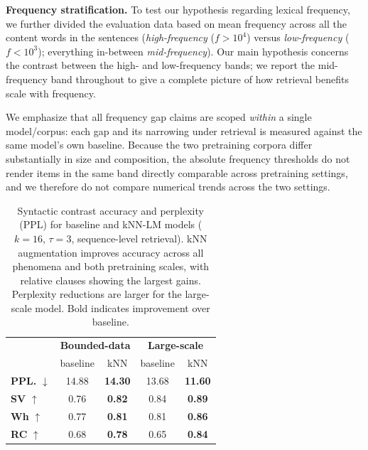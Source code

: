 \noindent \textbf{Frequency stratification.} To test our hypothesis regarding lexical frequency, we further divided the evaluation data based on mean frequency across all the content words in the sentences (\textit{high-frequency} ($f > 10^4$) versus \textit{low-frequency} ($f < 10^3$); everything in-between \textit{mid-frequency}). Our main hypothesis concerns the contrast between the high- and low-frequency bands; we report the mid-frequency band throughout to give a complete picture of how retrieval benefits scale with frequency.

\noindent We emphasize that all frequency gap claims are scoped \emph{within} a single model/corpus: each gap and its narrowing under retrieval is measured against the same model's own baseline. Because the two pretraining corpora differ substantially in size and composition, the absolute frequency thresholds do not render items in the same band directly comparable across pretraining settings, and we therefore do not compare numerical trends across the two settings.

\begin{table}[htbp]
\vspace{-5pt}
\caption{Syntactic contrast accuracy and perplexity (PPL) for baseline and kNN-LM models ($k=16$, $\tau=3$, sequence-level retrieval). kNN augmentation improves accuracy across all phenomena and both pretraining scales, with relative clauses showing the largest gains. Perplexity reductions are larger for the large-scale model. Bold indicates improvement over baseline.}
\vspace{6pt}
\label{tab:general_effects}
\centering
\small
\begin{tabular}{lcccc}
\toprule
\textbf{} & \multicolumn{2}{c}{\textbf{Bounded-data}} &
\multicolumn{2}{c}{\textbf{Large-scale}} \\
 & baseline & kNN & baseline & kNN \\
\midrule
\textbf{PPL.} $\downarrow$ & 14.88 & \textbf{14.30} & 13.68 & \textbf{11.60} \\
\textbf{SV} $\uparrow$     & 0.76  & \textbf{0.82}  & 0.84  & \textbf{0.89} \\
\textbf{Wh} $\uparrow$     & 0.77  & \textbf{0.81}  & 0.81  & \textbf{0.86} \\
\textbf{RC} $\uparrow$     & 0.68  & \textbf{0.78}  & 0.65  & \textbf{0.84} \\
\bottomrule
\end{tabular}
\vspace{-5pt}
\end{table}

